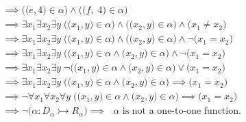\documentclass[12pt, letterpaper]{article}
\begin{document}
        \begin{align*}
            & \implies \Big(\big(e, 4\big) \in \alpha\Big) \wedge \Big(\big(f, \; 4\big) \in \alpha\Big) \\ 
            & \implies \exists x_1 \exists x_2 \exists y \; \Big( \big(x_1, y\big) \in \alpha \Big) \wedge
                                                   \Big( \big(x_2, y\big) \in \alpha \Big) \wedge
                                                   \Big( x_1 \neq x_2 \Big) \\
            & \implies \exists x_1 \exists x_2 \exists y \; \Big( \big(x_1, y\big) \in \alpha \Big) \wedge
                                                   \Big( \big(x_2, y\big) \in \alpha \Big) \wedge
                                                   \neg\Big( x_1 = x_2 \Big) \\
            & \implies \exists x_1 \exists x_2 \exists y \; \Big( \big(x_1, y\big) \in \alpha \wedge
                                                   \big(x_2, y\big) \in \alpha \Big) \wedge
                                                   \neg\Big( x_1 = x_2 \Big) \\
            & \implies \exists x_1 \exists x_2 \exists y \; \neg\Big( \big(x_1, y\big) \in \alpha \wedge
                                                   \big(x_2, y\big) \in \alpha \Big) \lor
                                                   \Big( x_1 = x_2 \Big) \\
            & \implies \exists x_1 \exists x_2 \exists y \; \Big( \big(x_1, y\big) \in \alpha \wedge
                                                   \big(x_2, y\big) \in \alpha \Big) \implies
                                                   \Big( x_1 = x_2 \Big) \\
            & \implies \neg\forall x_1 \forall x_2 \forall y \; \Big( \big(x_1, y\big) \in \alpha \wedge
                                                   \big(x_2, y\big) \in \alpha \Big) \implies
                                                   \Big( x_1 = x_2 \Big) \\
            & \implies \neg\Big( \alpha : D_{\alpha} \rightarrowtail R_{\alpha} \Big)
              \implies \text{ \(\alpha\) is not a one-to-one function.}
        \end{align*}
\end{document}
